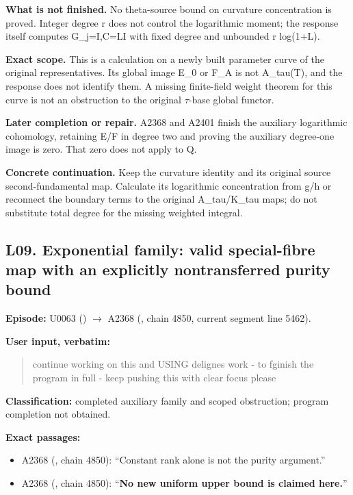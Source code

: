 \textbf{What is not finished.} No theta-source bound on curvature
concentration is proved. Integer degree r does not control the
logarithmic moment; the response itself computes G\_j=I,C=LI with fixed
degree and unbounded r log(1+L).

\textbf{Exact scope.} This is a calculation on a newly built parameter
curve of the original representatives. Its global image E\_0 or F\_A is
not A\_tau(T), and the response does not identify them. A missing
finite-field weight theorem for this curve is not an obstruction to the
original \allowbreak{}\ensuremath{τ}\allowbreak{}-base global functor.

\textbf{Later completion or repair.} A2368 and A2401 finish the
auxiliary logarithmic cohomology, retaining E/F in degree two and
proving the auxiliary degree-one image is zero. That zero does not apply
to Q.

\textbf{Concrete continuation.} Keep the curvature identity and its
original source second-fundamental map. Calculate its logarithmic
concentration from g/h or reconnect the boundary terms to the original
A\_tau/K\_tau maps; do not substitute total degree for the missing
weighted integral.

\subsection{L09. Exponential family: valid special-fibre map with an
explicitly nontransferred purity
bound}\label{TranscriptLedgerStage:l09.-exponential-family-valid-special-fibre-map-with-an-explicitly-nontransferred-purity-bound}

\textbf{Episode:} U0063
(\protect{})
\allowbreak{}\ensuremath{→}\allowbreak{} A2368
(\protect{}, chain 4850,
current segment line 5462).

\textbf{User input, verbatim:}

\begin{quote}
continue working on this and USING delignes work - to fginish the
program in full - keep pushing this with clear focus please
\end{quote}

\textbf{Classification:} completed auxiliary family and scoped
obstruction; program completion not obtained.

\textbf{Exact passages:}

\begin{itemize}
\tightlist
\item
  A2368 (\protect{}, chain
  4850): ``Constant rank alone is not the purity argument.''
\item
  A2368 (\protect{}, chain
  4850): ``\textbf{No new uniform upper bound is claimed here.}''
\end{itemize}

